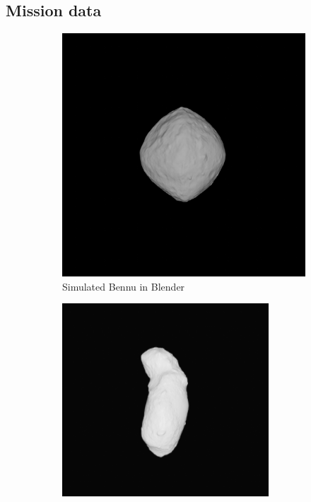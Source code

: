 \subsection{Mission data}
\begin{figure}
    \centering
    \captionsetup{justification=centering}
     \begin{subfigure}{0.23\textwidth}
         \includegraphics[width =\textwidth, height = \textwidth]{fig/render72.png}
         \caption{Simulated Bennu in Blender}
         \label{fig:y equals x}
     \end{subfigure}
    \hfill
     \begin{subfigure}{0.23\textwidth}
         \centering
         \includegraphics[width = \textwidth, height = \textwidth]{fig/Screen Shot 2021-02-18 at 11.43.43 AM.png}

\end{subfigure}
\end{figure}
